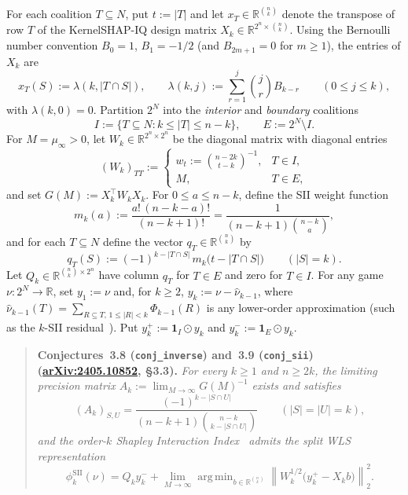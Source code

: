 \documentclass[11pt]{article}
\theoremstyle{plain}
\theoremstyle{definition}
\theoremstyle{remark}
\DeclareMathOperator*{\argmin}{arg\,min}
\begin{document}
For each coalition $T \subseteq N$, put $t := |T|$ and let $x_T \in \mathbb{R}^{\binom{n}{k}}$ denote the transpose of row $T$ of the KernelSHAP-IQ design matrix $X_k \in \mathbb{R}^{2^n \times \binom{n}{k}}$. Using the Bernoulli number convention $B_0 = 1$, $B_1 = -1/2$ (and $B_{2m+1} = 0$ for $m \ge 1$), the entries of $X_k$ are
\[
x_T(S) := \lambda(k, |T \cap S|), \qquad
\lambda(k, j) := \sum_{r=1}^j \binom{j}{r} B_{k-r} \qquad (0 \le j \le k),
\]
with $\lambda(k, 0) = 0$. Partition $2^N$ into the \emph{interior} and \emph{boundary} coalitions
\[
I := \{T \subseteq N : k \le |T| \le n - k\}, \qquad E := 2^N \setminus I.
\]
For $M = \mu_\infty > 0$, let $W_k \in \mathbb{R}^{2^n \times 2^n}$ be the diagonal matrix with diagonal entries
\[
(W_k)_{TT} := \begin{cases}
w_t := \binom{n - 2k}{t - k}^{-1}, & T \in I, \\[4pt]
M, & T \in E,
\end{cases}
\]
and set $G(M) := X_k^\top W_k X_k$. For $0 \le a \le n - k$, define the SII weight function
\[
m_k(a) := \frac{a!\,(n - k - a)!}{(n - k + 1)!} = \frac{1}{(n - k + 1)\binom{n - k}{a}},
\]
and for each $T \subseteq N$ define the vector $q_T \in \mathbb{R}^{\binom{n}{k}}$ by
\[
q_T(S) := (-1)^{k - |T \cap S|}\, m_k\bigl(t - |T \cap S|\bigr) \qquad (|S| = k).
\]
Let $Q_k \in \mathbb{R}^{\binom{n}{k} \times 2^n}$ have column $q_T$ for $T \in E$ and zero for $T \in I$. For any game $\nu : 2^N \to \mathbb{R}$, set $y_1 := \nu$ and, for $k \ge 2$, $y_k := \nu - \hat{\nu}_{k-1}$, where $\hat{\nu}_{k-1}(T) = \sum_{R \subseteq T,\, 1 \le |R| < k} \Phi_{k-1}(R)$ is any lower-order approximation (such as the $k$-SII residual~\cite{Bordt2023}). Put $y_k^+ := \mathbf{1}_I \odot y_k$ and $y_k^- := \mathbf{1}_E \odot y_k$.

\begin{quote}
\textbf{Conjectures~3.8 (\texttt{conj\_inverse}) and~3.9 (\texttt{conj\_sii}) (\href{https://arxiv.org/abs/2405.10852}{arXiv:2405.10852}, \S 3.3).}
\emph{For every $k \ge 1$ and $n \ge 2k$, the limiting precision matrix $A_k := \lim_{M \to \infty} G(M)^{-1}$ exists and satisfies
\begin{equation}\label{eq:conj-inv}
(A_k)_{S, U} = \frac{(-1)^{k - |S \cap U|}}{(n - k + 1)\binom{n - k}{k - |S \cap U|}} \qquad (|S| = |U| = k),
\end{equation}
and the order-$k$ Shapley Interaction Index~\cite{Grabisch1999} admits the split WLS representation
\begin{equation}\label{eq:conj-sii}
\phi_k^{\mathrm{SII}}(\nu) = Q_k y_k^- + \lim_{M \to \infty} \argmin_{b \in \mathbb{R}^{\binom{n}{k}}} \left\|W_k^{1/2}\bigl(y_k^+ - X_k b\bigr)\right\|_2^2.
\end{equation}}
\end{quote}
\end{document}
